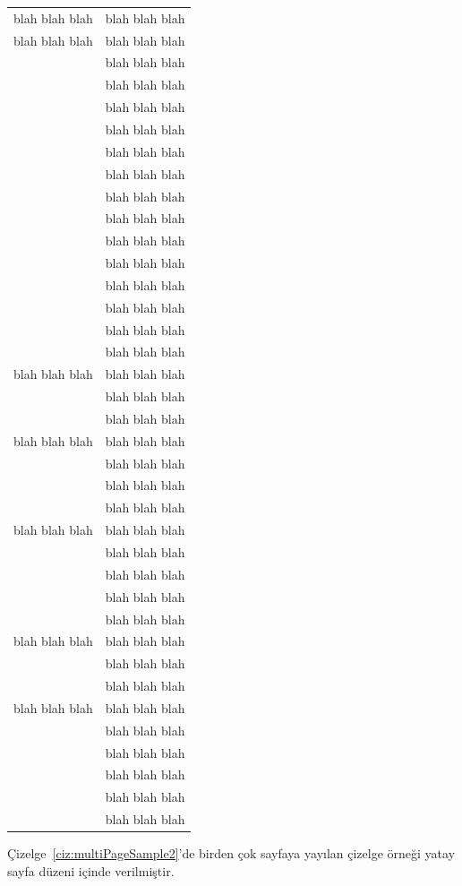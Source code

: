 \documentclass[a4paper,oneside,12pt]{report}
\begin{document}
\begin{landscape}
\begin{center}
\begin{longtable}{ll}
		blah blah blah& blah blah blah  \\
		blah blah blah & blah blah blah \\
		& blah blah blah \\
		& blah blah blah \\
		& blah blah blah \\
		& blah blah blah \\
		& blah blah blah \\
		& blah blah blah \\
		& blah blah blah \\
		& blah blah blah \\
		& blah blah blah \\
		& blah blah blah \\
		& blah blah blah \\
		& blah blah blah \\
		& blah blah blah \\
		& blah blah blah \\
		
		blah blah blah & blah blah blah \\
		& blah blah blah \\
		& blah blah blah \\
		
		blah blah blah & blah blah blah \\\hline
		& blah blah blah \\
		& blah blah blah \\
		& blah blah blah \\
		
		blah blah blah & blah blah blah \\
		& blah blah blah \\
		& blah blah blah \\
		& blah blah blah \\
		& blah blah blah \\
		blah blah blah & blah blah blah \\
		& blah blah blah \\
		& blah blah blah \\
		
		blah blah blah & blah blah blah \\
		& blah blah blah \\
		& blah blah blah \\
		& blah blah blah \\
		& blah blah blah \\
		& blah blah blah \\\hline 
	\end{longtable}
\end{center}
\end{landscape}
Çizelge~\ref{ciz:multiPageSample2}'de birden çok sayfaya yayılan çizelge örneği yatay sayfa düzeni içinde verilmiştir. \lipsum[1][1-6]
\end{document}
